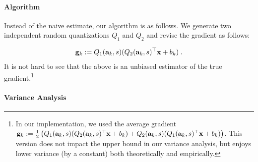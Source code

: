 \documentclass{article}
\def\a{{\bf a}}
\def\g{{\bf g}}
\def\x{{\bf x}}
\begin{document}
\paragraph{Algorithm}
Instead of the naive estimate, our algorithm is as follows.
We generate two independent
random quantizations $Q_1$
and $Q_2$ and revise the gradient as follows:


\[
\g_k := Q_1 (\a_k, s) (Q_2 (\a_k, s)^\top \x + b_k) \; .
\]
It is not hard to see that the above is an unbiased estimator of the true gradient.\footnote{In our implementation,
we used the average gradient $\g_k := \frac{1}{2}\left(Q_1 (\a_k, s) (Q_2 (\a_k, s)^\top \x + b_k) + 
Q_2 (\a_k, s) (Q_1 (\a_k, s)^\top \x + b_k)\right)$. This version does not impact  the upper bound in our variance analysis,
but enjoys lower variance (by a constant) both theoretically and empirically.}


\paragraph{Variance Analysis}
\end{document}
